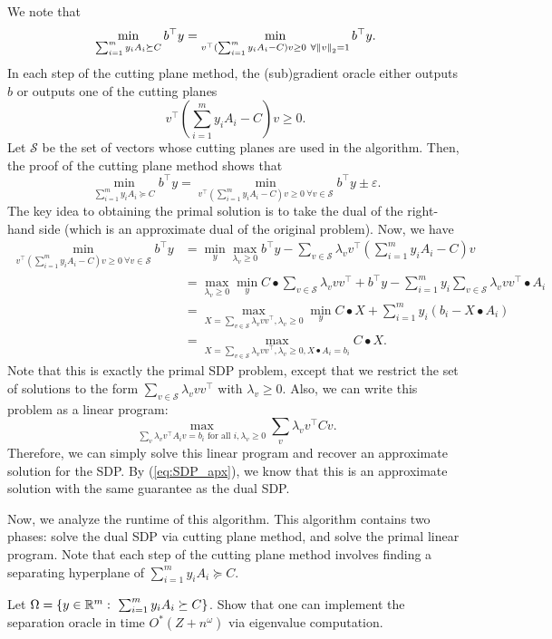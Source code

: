 We note that
\[
\min_{\sum^{m}_{i=1}y_{i}A_{i}\succeq C}b^{\top}y=\min_{v^{\top}(\sum^{m}_{i=1}y_{i}A_{i}-C)v\geq0\ \forall\norm v_{2}=1}b^{\top}y.
\]
In each step of the cutting plane method, the (sub)gradient oracle
either outputs $b$ or outputs one of the cutting planes
\[
v^{\top}(\sum^{m}_{i=1}y_{i}A_{i}-C)v\geq0.
\]
Let $\mathcal{S}$ be the set of vectors whose cutting planes are
used in the algorithm. Then, the proof of the cutting plane method
shows that
\begin{equation}
\min_{\sum^{m}_{i=1}y_{i}A_{i}\succeq C}b^{\top}y=\min_{v^{\top}(\sum^{m}_{i=1}y_{i}A_{i}-C)v\geq0\ \forall v\in\mathcal{S}}b^{\top}y\pm\varepsilon.\label{eq:SDP_apx}
\end{equation}
The key idea to obtaining the primal solution is to take the dual
of the right-hand side (which is an approximate dual of the original
problem). Now, we have
\begin{align*}
\min_{v^{\top}(\sum^{m}_{i=1}y_{i}A_{i}-C)v\geq0\ \forall v\in\mathcal{S}}b^{\top}y & =\min_{y}\max_{\lambda_{v}\geq0}b^{\top}y-\sum_{v\in\mathcal{S}}\lambda_{v}v^{\top}(\sum^{m}_{i=1}y_{i}A_{i}-C)v\\
 & =\max_{\lambda_{v}\geq0}\min_{y}C\bullet\sum_{v\in\mathcal{S}}\lambda_{v}vv^{\top}+b^{\top}y-\sum^{m}_{i=1}y_{i}\sum_{v\in\mathcal{S}}\lambda_{v}vv^{\top}\bullet A_{i}\\
 & =\max_{X=\sum_{v\in\mathcal{S}}\lambda_{v}vv^{\top},\lambda_{v}\geq0}\min_{y}C\bullet X+\sum^{m}_{i=1}y_{i}(b_{i}-X\bullet A_{i})\\
 & =\max_{X=\sum_{v\in\mathcal{S}}\lambda_{v}vv^{\top},\lambda_{v}\geq0,X\bullet A_{i}=b_{i}}C\bullet X.
\end{align*}
Note that this is exactly the primal SDP problem, except that we restrict
the set of solutions to the form $\sum_{v\in\mathcal{S}}\lambda_{v}vv^{\top}$
with $\lambda_{v}\geq0$. Also, we can write this problem as a linear
program:
\begin{equation}
\max_{\sum_{v}\lambda_{v}v^{\top}A_{i}v=b_{i}\text{ for all }i,\lambda_{v}\geq0}\sum_{v}\lambda_{v}v^{\top}Cv.\label{eq:SDP_LP}
\end{equation}
Therefore, we can simply solve this linear program and recover an
approximate solution for the SDP. By (\ref{eq:SDP_apx}), we know
that this is an approximate solution with the same guarantee as the
dual SDP. 

Now, we analyze the runtime of this algorithm. This algorithm contains
two phases: solve the dual SDP via cutting plane method, and solve
the primal linear program. Note that each step of the cutting plane
method involves finding a separating hyperplane of $\sum^{m}_{i=1}y_{i}A_{i}\succeq C$. 
\begin{xca}
Let $\Omega=\{y\in\Rm:\ \sum^{m}_{i=1}y_{i}A_{i}\succeq C\}$. Show
that one can implement the separation oracle in time $O^{*}(Z+n^{\omega})$
via eigenvalue computation.
\end{xca}

